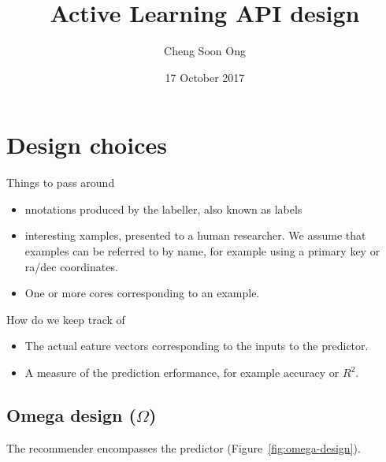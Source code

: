 \documentclass[11pt,twoside]{article}
\title{Active Learning API design}
\author{Cheng Soon Ong}
\date{17 October 2017}
\newcommand{\name}[1]{ {\color{red}{\sffamily\bfseries{#1}}} }
\begin{document}
\maketitle

\section{Design choices}

Things to pass around
\begin{itemize}
  \item \name{A}nnotations produced by the labeller, also known as labels
  \item interesting \name{E}xamples, presented to a human researcher. We assume that examples
    can be referred to by name, for example using a primary key or ra/dec coordinates.
  \item One or more \name{S}cores corresponding to an example.
\end{itemize}

\noindent How do we keep track of
\begin{itemize}
  \item The actual \name{F}eature vectors corresponding to the inputs to the predictor.
  \item A measure of the prediction \name{P}erformance, for example accuracy or $R^2$.
\end{itemize}


\subsection{Omega design ($\Omega$)}

The recommender encompasses the predictor (Figure~\ref{fig:omega-design}).
\end{document}
